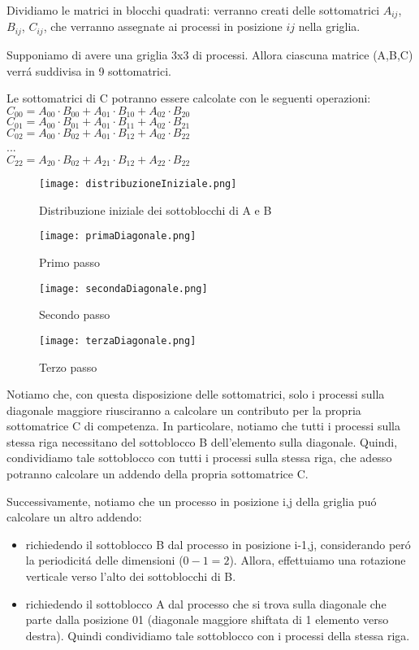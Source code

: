 Dividiamo le matrici in blocchi quadrati: verranno creati delle sottomatrici $A_{ij}$, $B_{ij}$, $C_{ij}$, che verranno assegnate ai processi in posizione $ij$ nella griglia.

Supponiamo di avere una griglia 3x3 di processi. Allora ciascuna matrice (A,B,C) verrá suddivisa in 9 sottomatrici.

Le sottomatrici di C potranno essere calcolate con le seguenti operazioni:
$C_{00} = A_{00}\cdot B_{00} + A_{01}\cdot B_{10} + A_{02}\cdot B_{20}$ \\
$C_{01} = A_{00}\cdot B_{01} + A_{01}\cdot B_{11} + A_{02}\cdot B_{21}$ \\
$C_{02} = A_{00}\cdot B_{02} + A_{01}\cdot B_{12} + A_{02}\cdot B_{22}$ \\
... \\
$C_{22} = A_{20}\cdot B_{02} + A_{21}\cdot B_{12} + A_{22}\cdot B_{22}$ \\


\begin{figure}[!htbp]
    \centering
    \texttt{[image: distribuzioneIniziale.png]}
    \caption{Distribuzione iniziale dei sottoblocchi di A e B}
    \label{fig:enter-label}
\end{figure}  
\begin{figure}[!htbp]
    \centering
    \texttt{[image: primaDiagonale.png]}
    \caption{Primo passo}
    \label{fig:enter-label}
\end{figure}  
\begin{figure}[!htbp]
    \centering
    \texttt{[image: secondaDiagonale.png]}
    \caption{Secondo passo}
    \label{fig:enter-label}
\end{figure}  
\begin{figure}[!htbp]
    \centering
    \texttt{[image: terzaDiagonale.png]}
    \caption{Terzo passo}
    \label{fig:enter-label}
\end{figure}  

Notiamo che, con questa disposizione delle sottomatrici, solo i processi sulla diagonale maggiore riusciranno a calcolare un contributo per la propria sottomatrice C di competenza. In particolare, notiamo che tutti i processi sulla stessa riga necessitano del sottoblocco B dell'elemento sulla diagonale. Quindi, condividiamo tale sottoblocco con tutti i processi sulla stessa riga, che adesso potranno calcolare un addendo della propria sottomatrice C.

Successivamente, notiamo che un processo in posizione i,j della griglia puó calcolare un altro addendo: 
\begin{itemize}
    \item richiedendo il sottoblocco B dal processo in posizione i-1,j, considerando peró la periodicitá delle dimensioni ($0 - 1 = 2$). Allora, effettuiamo una rotazione verticale verso l'alto dei sottoblocchi di B.
    \item richiedendo il sottoblocco A dal processo che si trova sulla diagonale che parte dalla posizione 01 (diagonale maggiore shiftata di 1 elemento verso destra). Quindi condividiamo tale sottoblocco con i processi della stessa riga.
\end{itemize}


